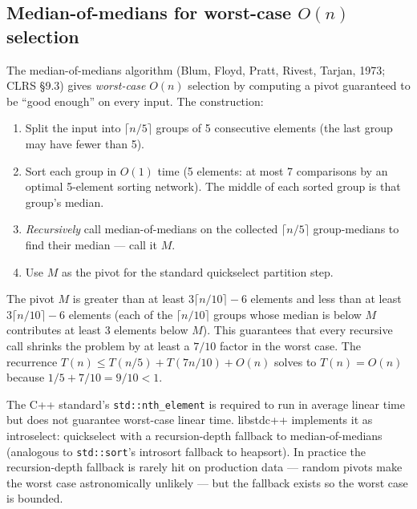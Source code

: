 \documentclass[11pt]{article}
\begin{document}
\subsection*{Median-of-medians for worst-case $O(n)$ selection}

The median-of-medians algorithm (Blum, Floyd, Pratt, Rivest,
Tarjan, 1973; CLRS \S9.3) gives \emph{worst-case} $O(n)$
selection by computing a pivot guaranteed to be ``good enough'' on
every input. The construction:

\begin{enumerate}[leftmargin=*]
    \item Split the input into $\lceil n / 5 \rceil$ groups of 5
          consecutive elements (the last group may have fewer
          than 5).
    \item Sort each group in $O(1)$ time (5 elements: at most
          7 comparisons by an optimal 5-element sorting network).
          The middle of each sorted group is that group's median.
    \item \emph{Recursively} call median-of-medians on the
          collected $\lceil n/5 \rceil$ group-medians to find
          their median --- call it $M$.
    \item Use $M$ as the pivot for the standard quickselect
          partition step.
\end{enumerate}

The pivot $M$ is greater than at least
$3 \lceil n/10 \rceil - 6$ elements and less than at least
$3 \lceil n/10 \rceil - 6$ elements (each of the $\lceil n/10 \rceil$
groups whose median is below $M$ contributes at least 3 elements
below $M$). This guarantees that every recursive call shrinks the
problem by at least a $7/10$ factor in the worst case. The
recurrence
$T(n) \le T(n/5) + T(7n/10) + O(n)$
solves to $T(n) = O(n)$ because $1/5 + 7/10 = 9/10 < 1$.

\begin{notebox}
The C++ standard's \texttt{std::nth\_element} is required to run
in average linear time but does not guarantee worst-case linear
time. libstdc++ implements it as introselect: quickselect with a
recursion-depth fallback to median-of-medians (analogous to
\texttt{std::sort}'s introsort fallback to heapsort). In practice
the recursion-depth fallback is rarely hit on production data ---
random pivots make the worst case astronomically unlikely --- but
the fallback exists so the worst case is bounded.
\end{notebox}
\end{document}
